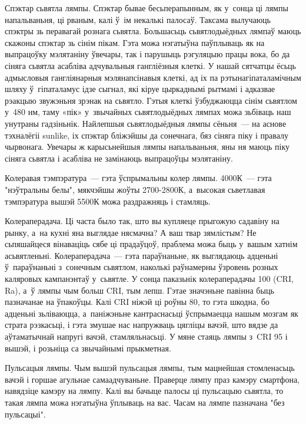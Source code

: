 Спэктар сьвятла лямпы. Спэктар бывае бесьперапынным, як у~сонца ці лямпы напальваньня, ці рваным, калі ў~ім некалькі палосаў. Таксама вылучаюць спэктры зь перавагай рознага сьвятла. Большасьць сьвятлодыёдных лямпаў маюць скажоны спэктар зь сінім пікам. Гэта можа нэгатыўна паўплываць як на выпрацоўку мэлятаніну ўвечары, так і парушыць рэгуляцыю працы вока, бо да сіняга сьвятла асабліва адчувальныя гангліёзныя клеткі. У нашай сятчатцы ёсьць адмысловыя гангліянарныя мэлянапсінавыя клеткі, ад іх па рэтынагіпаталамічным шляху ў~гіпаталамус ідзе сыгнал, які кіруе цыркаднымі рытмамі і адказвае рэакцыю звужэньня зрэнак на сьвятло. Гэтыя клеткі ўзбуджаюцца сінім сьвятлом у~480 нм, таму «пік» у~звычайных сьвятлодыёдных лямпах можа зьбіваць наш унутраны гадзіньнік. Найлепшыя сьвятлодыёдныя лямпы сёньня~--- на аснове тэхналёгіі sunlike, іх спэктар бліжэйшы да сонечнага, бяз сіняга піку і правалу чырвонага. Увечары ж карысьнейшыя лямпы напальваньня, яны ня маюць піку сіняга сьвятла і асабліва не замінаюць выпрацоўцы мэлятаніну.

Колеравая тэмпэратура~--- гэта ўспрымальны колер лямпы. 4000К~--- гэта "нэўтральны белы", мякчэйшы жоўты 2700-2800К, а~высокая сьветлавая тэмпэратура вышэй 5500К можа раздражняць і стамляць.

Колераперадача. Ці часта было так, што вы купляеце прыгожую садавіну на рынку, а~на кухні яна выглядае нясмачна? А ваш твар зямлістым? Не сьпяшайцеся вінаваціць сябе ці прадаўцоў, праблема можа быць у~вашым хатнім асьвятленьні. Колераперадача~--- гэта параўнаньне, як выглядаюць адценьні ў~параўнаньні з~сонечным сьвятлом, наколькі раўнамерны ўзровень розных каляровых кампанэнтаў у~сьвятле. У сонца паказьнік колераперадачы 100 (CRI, Ra), а~ў лямпы чым больш CRI, тым лепш. Гэтае значэньне павінна быць пазначанае на ўпакоўцы. Калі CRI ніжэй ці роўны 80, то гэта шкодна, бо адценьні зьліваюцца, а~паніжэньне кантраснасьці ўспрымаецца нашым мозгам як страта рэзкасьці, і гэта змушае нас напружваць цягліцы вачэй, што вядзе да аўтаматычнай напругі вачэй, стамляльнасьці. У мяне стаяць лямпы з~CRI 95 і вышэй, і розьніца са звычайнымі прыкметная.

Пульсацыя лямпы. Чым вышэй пульсацыя лямпы, тым мацнейшая стомленасьць вачэй і горшае агульнае самаадчуваньне. Праверце лямпу праз камэру смартфона, навядзіце камэру на лямпу. Калі вы бачыце палосы ці пульсацыю сьвятла, то такая лямпа можа нэгатыўна ўплываць на вас. Часам на лямпе пазначана "без пульсацыі".


